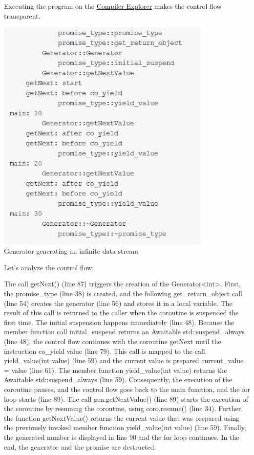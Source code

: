 Executing the program on the \href{https://godbolt.org/z/cTW9Gq}{Compiler Explorer} makes the control flow transparent.

\begin{center}
\includegraphics[width=0.8\textwidth]{content/3/chapter7/images/14.png}\\
Generator generating an infinite data stream
\end{center}

Let’s analyze the control flow.

The call getNext() (line 87) triggers the creation of the Generator<int>. First, the promise\_type (line 38) is created, and the following get\_return\_object call (line 54) creates the generator (line 56) and stores it in a local variable. The result of this call is returned to the caller when the coroutine is suspended the first time. The initial suspension happens immediately (line 48). Because the member function call initial\_suspend returns an Awaitable std::suspend\_always (line 48), the control flow continues with the coroutine getNext until the instruction co\_yield value (line 79). This call is mapped to the call yield\_value(int value) (line 59) and the current value is prepared current\_value = value (line 61). The member function yield\_value(int value) returns the Awaitable std::suspend\_always (line 59). Consequently, the execution of the coroutine pauses, and the control flow goes back to the main function, and the for loop starts (line 89). The call gen.getNextValue() (line 89) starts the execution of the coroutine by resuming the coroutine, using coro.resume() (line 34). Further, the function getNextValue() returns the current value that was prepared using the previously invoked member function yield\_value(int value) (line 59). Finally, the generated number is displayed in line 90 and the for loop continues. In the end, the generator and the promise are destructed.

